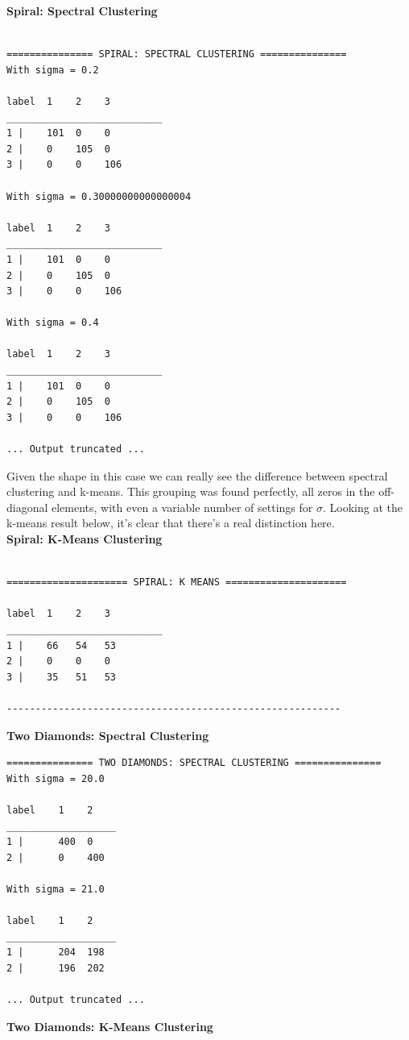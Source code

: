\documentclass[11pt]{article}
\begin{document}
\textbf{Spiral: Spectral Clustering} 
\begin{verbatim}

=============== SPIRAL: SPECTRAL CLUSTERING ===============
With sigma = 0.2

label  1    2    3    
___________________________
1 |    101  0    0    
2 |    0    105  0    
3 |    0    0    106    

With sigma = 0.30000000000000004

label  1    2    3    
___________________________
1 |    101  0    0    
2 |    0    105  0    
3 |    0    0    106    

With sigma = 0.4

label  1    2    3    
___________________________
1 |    101  0    0    
2 |    0    105  0    
3 |    0    0    106    

... Output truncated ... 	

\end{verbatim}
Given the shape in this case we can really see the difference between spectral clustering and k-means. This grouping was found perfectly, all zeros in the off-diagonal elements, with even a variable number of settings for $\sigma$. Looking at the k-means result below, it's clear that there's a real distinction here.
\\[5pt]
\textbf{Spiral: K-Means Clustering} 
\begin{verbatim}

===================== SPIRAL: K MEANS =====================

label  1    2    3    
___________________________
1 |    66   54   53    
2 |    0    0    0    
3 |    35   51   53    

----------------------------------------------------------

\end{verbatim}
\textbf{Two Diamonds: Spectral Clustering} 
\begin{verbatim}
=============== TWO DIAMONDS: SPECTRAL CLUSTERING ===============
With sigma = 20.0

label    1    2    
___________________
1 |      400  0    
2 |      0    400    

With sigma = 21.0

label    1    2    
___________________
1 |      204  198    
2 |      196  202    

... Output truncated ... 	

\end{verbatim}
\textbf{Two Diamonds: K-Means Clustering} 
\end{document}
